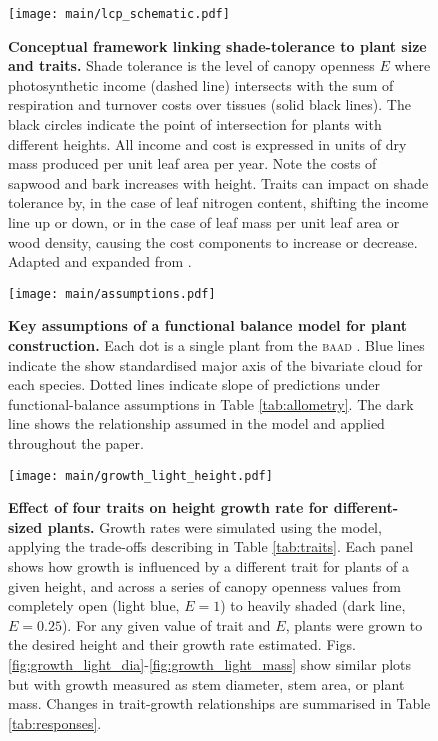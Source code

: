\documentclass[a4paper,11pt]{article}
\begin{document}
\newpage

\begin{figure}[ht]
\centering
\texttt{[image: main/lcp\_schematic.pdf]}
\caption{\textbf{Conceptual framework linking shade-tolerance to plant size and traits.}
Shade tolerance is the level of canopy openness  $E$ where photosynthetic income (dashed line) intersects with the sum of respiration and turnover costs over tissues (solid black lines). The black circles indicate the point of intersection for plants with different heights. All income and cost is expressed in units of dry mass produced  per unit leaf area per year. Note the costs of sapwood and bark increases with height.
Traits can impact on shade tolerance by, in the case of leaf nitrogen content, shifting the income line up or down, or in the case of leaf mass per unit leaf area or wood density, causing the cost components to increase or decrease. Adapted and expanded from \citet{Givnish-1988}.
\label{fig:wplcp_idea}}
\end{figure}

\newpage

\begin{figure}[ht]
\centering
\texttt{[image: main/assumptions.pdf]}
\caption{\textbf{Key assumptions of a functional balance model for plant construction.}
Each dot is a single plant from the \textsc{baad} \citep{Falster-2015b}.
Blue lines indicate the show standardised major axis of the bivariate cloud for each species. Dotted lines indicate slope of predictions under functional-balance assumptions in Table \ref{tab:allometry}. The dark line shows the relationship assumed in the {\plant} model and applied throughout the paper.
\label{fig:assumptions}}
\end{figure}

\newpage

\begin{figure}[ht]
\centering
\texttt{[image: main/growth\_light\_height.pdf]}
\caption{\textbf{Effect of four traits on height growth rate for different-sized plants.}
Growth rates were simulated using the {\plant} model, applying the trade-offs describing in Table \ref{tab:traits}. Each panel shows how growth is influenced by a different trait for plants of a given height, and across a series of canopy openness values from completely open (light blue,  $E=1$) to heavily shaded (dark line, $E=0.25$). For any given value of trait and $E$, plants were grown to the desired height and their growth rate estimated. Figs. \ref{fig:growth_light_dia}-\ref{fig:growth_light_mass} show similar plots but with growth measured as stem diameter, stem area, or plant mass. Changes in trait-growth relationships are summarised in Table \ref{tab:responses}.
\label{fig:growth_light_height}}
\end{figure}
\end{document}
